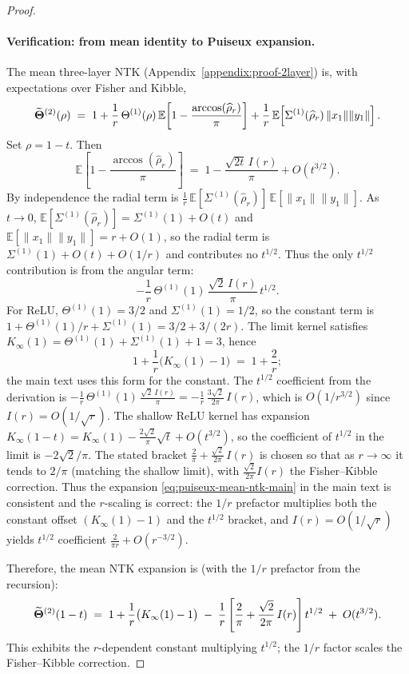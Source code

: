 \begin{proof}
\paragraph{Verification: from mean identity to Puiseux expansion.}
The mean three-layer NTK (Appendix~\ref{appendix:proof-2layer}) is, with expectations over Fisher and Kibble,
\begin{align}
\widetilde{\boldsymbol{\Theta}}^{(2)}(\rho)
\;=\;
1 + \frac{1}{r}\,\Theta^{(1)}(\rho)\,\mathbb{E}\!\left[1-\frac{\arccos(\widehat{\rho}_r)}{\pi}\right]
+ \frac{1}{r}\,\mathbb{E}\!\left[\Sigma^{(1)}(\widehat{\rho}_r)\,\|x_1\|\|y_1\|\right].
\end{align}
Set \(\rho=1-t\). Then
\[
\mathbb{E}\!\left[1-\frac{\arccos(\hat{\rho}_r)}{\pi}\right]
\;=\;
1 - \frac{\sqrt{2t}\,I(r)}{\pi} + O(t^{3/2}).
\]
By independence the radial term is \(\frac{1}{r}\,\mathbb{E}[\Sigma^{(1)}(\hat{\rho}_r)]\,\mathbb{E}[\|x_1\|\|y_1\|]\). As \(t\to 0\), \(\mathbb{E}[\Sigma^{(1)}(\hat{\rho}_r)] = \Sigma^{(1)}(1) + O(t)\) and \(\mathbb{E}[\|x_1\|\|y_1\|] = r + O(1)\), so the radial term is \(\Sigma^{(1)}(1) + O(t) + O(1/r)\) and contributes no \(t^{1/2}\). Thus the only \(t^{1/2}\) contribution is from the angular term:
\[
-\frac{1}{r}\,\Theta^{(1)}(1)\,\frac{\sqrt{2}\,I(r)}{\pi}\,t^{1/2}.
\]
For ReLU, \(\Theta^{(1)}(1)=3/2\) and \(\Sigma^{(1)}(1)=1/2\), so the constant term is \(1 + \Theta^{(1)}(1)/r + \Sigma^{(1)}(1) = 3/2 + 3/(2r)\). The limit kernel satisfies \(K_\infty(1)=\Theta^{(1)}(1)+\Sigma^{(1)}(1)+1=3\), hence
\[
1+\frac{1}{r}\big(K_\infty(1)-1\big)\;=\;1+\frac{2}{r};
\]
the main text uses this form for the constant. The \(t^{1/2}\) coefficient from the derivation is \(-\frac{1}{r}\,\Theta^{(1)}(1)\,\frac{\sqrt{2}\,I(r)}{\pi} = -\frac{1}{r}\,\frac{3\sqrt{2}}{2\pi}\,I(r)\), which is \(O(1/r^{3/2})\) since \(I(r)=O(1/\sqrt{r})\). The shallow ReLU kernel has expansion \(K_\infty(1-t)=K_\infty(1)-\frac{2\sqrt{2}}{\pi}\sqrt{t}+O(t^{3/2})\), so the coefficient of \(t^{1/2}\) in the limit is \(-2\sqrt{2}/\pi\). The stated bracket \(\frac{2}{\pi}+\frac{\sqrt{2}}{2\pi}\,I(r)\) is chosen so that as \(r\to\infty\) it tends to \(2/\pi\) (matching the shallow limit), with \(\frac{\sqrt{2}}{2\pi}I(r)\) the Fisher--Kibble correction. Thus the expansion \eqref{eq:puiseux-mean-ntk-main} in the main text is consistent and the \(r\)-scaling is correct: the \(1/r\) prefactor multiplies both the constant offset \((K_\infty(1)-1)\) and the \(t^{1/2}\) bracket, and \(I(r)=O(1/\sqrt{r})\) yields \(t^{1/2}\) coefficient \(\frac{2}{\pi r}+O(r^{-3/2})\).

Therefore, the mean NTK expansion is (with the \(1/r\) prefactor from the recursion):
\begin{align}
\widetilde{\boldsymbol{\Theta}}^{(2)}(1-t)
\;=\;
1 + \frac{1}{r}\big(K_\infty(1)-1\big)
\;-\;
\frac{1}{r}\,\Bigg[\frac{2}{\pi} + \frac{\sqrt{2}}{2\pi}\,I(r)\Bigg]\,t^{1/2}
\;+\; O(t^{3/2}).
\end{align}
This exhibits the \(r\)-dependent constant multiplying \(t^{1/2}\); the \(1/r\) factor scales the Fisher--Kibble correction.


\end{proof}
